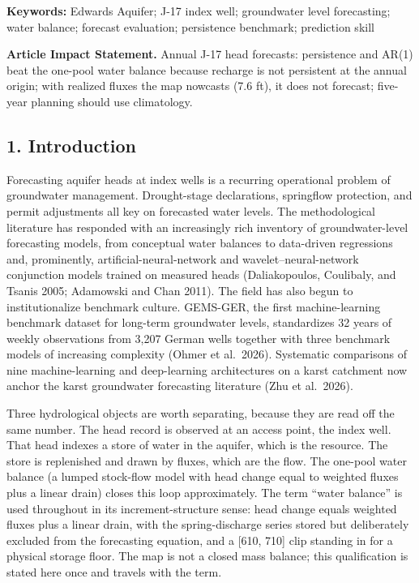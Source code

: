 \documentclass[11pt]{article}
\begin{document}
\textbf{Keywords:} Edwards Aquifer; J-17 index well; groundwater level
forecasting; water balance; forecast evaluation; persistence benchmark;
prediction skill

\textbf{Article Impact Statement.} Annual J-17 head forecasts:
persistence and AR(1) beat the one-pool water balance because recharge
is not persistent at the annual origin; with realized fluxes the map
nowcasts (7.6 ft), it does not forecast; five-year planning should use
climatology.

\subsection{1. Introduction}\label{introduction}

Forecasting aquifer heads at index wells is a recurring operational
problem of groundwater management. Drought-stage declarations,
springflow protection, and permit adjustments all key on forecasted
water levels. The methodological literature has responded with an
increasingly rich inventory of groundwater-level forecasting models,
from conceptual water balances to data-driven regressions and,
prominently, artificial-neural-network and wavelet--neural-network
conjunction models trained on measured heads (Daliakopoulos, Coulibaly,
and Tsanis 2005; Adamowski and Chan 2011). The field has also begun to
institutionalize benchmark culture. GEMS-GER, the first machine-learning
benchmark dataset for long-term groundwater levels, standardizes 32
years of weekly observations from 3,207 German wells together with three
benchmark models of increasing complexity (Ohmer et al.~2026).
Systematic comparisons of nine machine-learning and deep-learning
architectures on a karst catchment now anchor the karst groundwater
forecasting literature (Zhu et al.~2026).

Three hydrological objects are worth separating, because they are read
off the same number. The head record is observed at an access point, the
index well. That head indexes a store of water in the aquifer, which is
the resource. The store is replenished and drawn by fluxes, which are
the flow. The one-pool water balance (a lumped stock-flow model with
head change equal to weighted fluxes plus a linear drain) closes this
loop approximately. The term ``water balance'' is used throughout in its
increment-structure sense: head change equals weighted fluxes plus a
linear drain, with the spring-discharge series stored but deliberately
excluded from the forecasting equation, and a {[}610, 710{]} clip
standing in for a physical storage floor. The map is not a closed mass
balance; this qualification is stated here once and travels with the
term.
\end{document}
